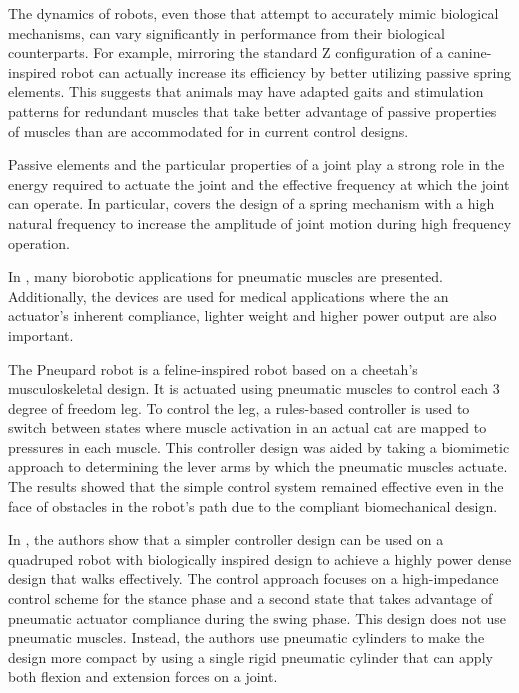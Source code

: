 
The dynamics of robots, even those that attempt to accurately mimic biological
mechanisms, can vary significantly in performance from their biological
counterparts. For example, mirroring the standard Z configuration of a canine-
inspired robot can actually increase its efficiency by better utilizing passive
spring elements. This suggests that animals may have adapted gaits and
stimulation patterns for redundant muscles that take better advantage of passive
properties of muscles than are accommodated for in current control designs.
\cite{HindLegMorphology}

Passive elements and the particular properties of a joint play a strong role in
the energy required to actuate the joint and the effective frequency at which the joint
can operate. In particular, \cite{Na2015} covers the design of a spring
mechanism with a high natural frequency to increase the amplitude of joint
motion during high frequency operation.



In \cite{PAMApplicationSurvey}, many biorobotic applications for pneumatic
muscles are presented.
Additionally, the devices are used for medical applications where the an actuator's
inherent compliance, lighter weight and higher power output are also important. 

The Pneupard robot is a feline-inspired robot based on a cheetah's
musculoskeletal design. It is actuated using pneumatic muscles to control each 3
degree of freedom leg. To control the leg, a rules-based controller is used to switch between
states where muscle activation in an actual cat are mapped to pressures in each
muscle. This controller design was aided by taking a biomimetic approach to determining the lever
arms by which the pneumatic muscles actuate. The results showed that the simple
control system remained effective even in the face of obstacles in the robot's
path due to the compliant biomechanical design.
\cite{Pneupard2013}

In \cite{Wait2014}, the authors show that a simpler controller design can be
used on a quadruped robot with biologically inspired design to achieve a highly
power dense design that walks effectively. The control approach focuses on
a high-impedance control scheme for the stance phase and a second state
that takes advantage of pneumatic actuator compliance during the swing phase.
This design does not use pneumatic muscles. Instead, the authors use pneumatic
cylinders to make the design more compact by using a single rigid pneumatic cylinder that can apply both
flexion and extension forces on a joint. 

